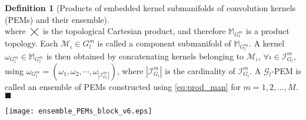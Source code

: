 \documentclass[10pt,journal,compsoc]{IEEEtran}
\theoremstyle{definition}
\newtheorem{definition}[theorem]{Definition}
\theoremstyle{definition}
\theoremstyle{remark}
\theoremstyle{remark}
\theoremstyle{remark}
\newcommand*{\QEDbs}{\hfill\ensuremath{\blacksquare}}%
\begin{document}
\begin{definition}[Products of embedded kernel submanifolds of convolution kernels (PEMs) and their ensemble]
\begin{equation}
\label{eq:prod_man}
\end{equation}
where $\bigtimes$ is the topological Cartesian product, and therefore $\mathbb{M}_{G^m_l}$ is a product topology. Each ${\mathcal{M}_{\iota} \in  {G}^m_l}$ is called a component submanifold of $\mathbb{M}_{G^m_l}$. A kernel $\omega_{G^m_l} \in \mathbb{M}_{G^m_l}$ is then obtained by concatenating kernels belonging to $\mathcal{M}_{\iota}$, $\forall \iota \in \mathcal{I}^m_{{G}_l}$, using  ${\omega_{G^m_l} = (\omega_1, \omega_2, \cdots, \omega_{|\mathcal{I}^m_{{G}_l}|})}$, where $|\mathcal{I}^m_{{G}_l}|$ is the cardinality of $\mathcal{I}^m_{{G}_l}$. A $\mathcal{G}_l$-PEM is called an ensemble of PEMs constructed using \eqref{eq:prod_man} for $m=1,2,\ldots,M$. %
\QEDbs
\end{definition}



\begin{figure*}[t!]
	\centering
	\texttt{[image: ensemble\_PEMs\_block\_v6.eps]}%
	\caption{An illustration for employment of the proposed PI, PO and PIO strategies at the $l^{th}$ layer of a CNN.}
	\label{fig_block}
\end{figure*}
\end{document}
